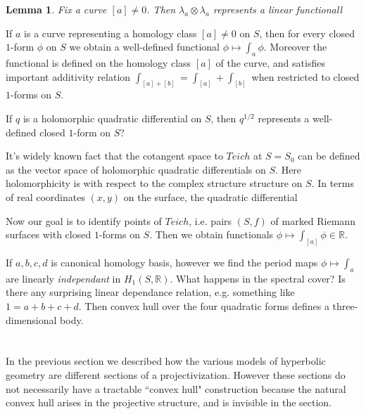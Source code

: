 \documentclass[12pt]{article}
\newtheorem{lem}[thm]{Lemma}
\theoremstyle{definition}
\theoremstyle{remark}
\newcommand{\bR}{\mathbb{R}}
\begin{document}
\begin{lem}
Fix a curve $[a]\neq 0$. Then $\lambda_a\otimes \lambda_a$ represents a linear functionall
\end{lem}
 
 
 
If $a$ is a curve representing a homology class $[a]\neq 0$ on $S$, then for every closed $1$-form $\phi$ on $S$ we obtain a well-defined functional $\phi\mapsto \int_a \phi$. Moreover the functional is defined on the homology class $[a]$ of the curve, and satisfies important additivity relation $\int_{[a]+[b]}=\int_{[a]}+\int_{[b]}$ when restricted to closed $1$-forms on $S$. 

If $q$ is a holomorphic quadratic differential on $S$, then $q^{1/2}$ represents a well-defined closed $1$-form on $S$? 

It's widely known fact that the cotangent space to $Teich$ at $S=S_0$ can be defined as the vector space of holomorphic quadratic differentials on $S$. Here holomorphicity is with respect to the complex structure structure on $S$. In terms of real coordinates $(x,y)$ on the surface, the quadratic differential 


Now our goal is to identify points of $Teich$, i.e. pairs $(S,f)$ of marked Riemann surfaces with closed $1$-forms on $S$. Then we obtain functionals $\phi \mapsto \int_{[a]}\phi \in \bR$. 

If $a,b,c,d$ is canonical homology basis, however we find the period maps $\phi \mapsto \int_{a}$ are linearly \emph{independant} in $H_1(S, \bR)$. What happens in the spectral cover? Is there any surprising linear dependance relation, e.g. something like $1=a+b+c+d$. Then convex hull over the four quadratic forms defines a three-dimensional body. 



\section{}
In the previous section we described how the various models of hyperbolic geometry are different sections of a projectivization. However these sections do not necessarily have a tractable ``convex hull" construction because the natural convex hull arises in the projective structure, and is invisible in the section.
\end{document}
